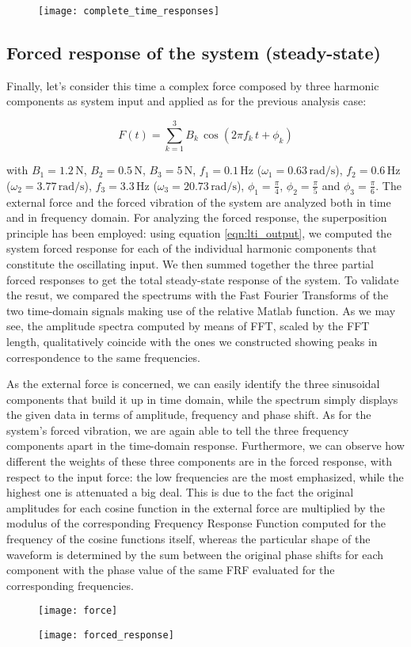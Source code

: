\documentclass[a4paper,12pt,oneside]{article}
\begin{document}
\begin{figure}[h]
	\hspace{-70pt}
	\texttt{[image: complete\_time\_responses]}
\end{figure}

\subsection{Forced response of the system (steady-state)}

Finally, let's consider this time a complex force composed by three harmonic components as system input and applied as for the previous analysis case:

\[ F(t) = \sum_{k=1}^3 B_k \, \cos(2 \pi f_k \, t + \phi_k) \]

with $ B_1 = 1.2 \, \text{N} $, $ B_2 = 0.5 \, \text{N} $, $ B_3 = 5 \, \text{N} $, $ f_1 = 0.1 \, \text{Hz} $ ($ \omega_1 = 0.63 \, \text{rad/s} $), $ f_2 = 0.6 \, \text{Hz} $ ($ \omega_2 = 3.77 \, \text{rad/s} $), $ f_3 = 3.3 \, \text{Hz} $ ($ \omega_3 = 20.73 \, \text{rad/s} $), $ \phi_1 = \frac{\pi}{4} $, $ \phi_2 = \frac{\pi}{5} $ and $ \phi_3 = \frac{\pi}{6} $. The external force and the forced vibration of the system are analyzed both in time and in frequency domain. For analyzing the forced response, the superposition principle has been employed: using equation \eqref{eqn:lti_output}, we computed the system forced response for each of the individual harmonic components that constitute the oscillating input. We then summed together the three partial forced responses to get the total steady-state response of the system. To validate the resut, we compared the spectrums with the Fast Fourier Transforms of the two time-domain signals making use of the relative Matlab function. As we may see, the amplitude spectra computed by means of FFT, scaled by the FFT length, qualitatively coincide with the ones we constructed showing peaks in correspondence to the same frequencies.

As the external force is concerned, we can easily identify the three sinusoidal components that build it up in time domain, while the spectrum simply displays the given data in terms of amplitude, frequency and phase shift. As for the system's forced vibration, we are again able to tell the three frequency components apart in the time-domain response. Furthermore, we can observe how different the weights of these three components are in the forced response, with respect to the input force: the low frequencies are the most emphasized, while the highest one is attenuated a big deal. This is due to the fact the original amplitudes for each cosine function in the external force are multiplied by the modulus of the corresponding Frequency Response Function computed for the frequency of the cosine functions itself, whereas the particular shape of the waveform is determined by the sum between the original phase shifts for each component with the phase value of the same FRF evaluated for the corresponding frequencies.

\begin{figure}
	\hspace{-70pt}
	\texttt{[image: force]}
\end{figure}

\begin{figure}
	\hspace{-70pt}
	\texttt{[image: forced\_response]}
\end{figure}
\end{document}
